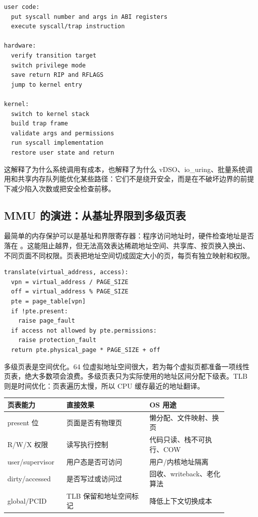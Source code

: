 \begin{lstlisting}
user code:
  put syscall number and args in ABI registers
  execute syscall/trap instruction

hardware:
  verify transition target
  switch privilege mode
  save return RIP and RFLAGS
  jump to kernel entry

kernel:
  switch to kernel stack
  build trap frame
  validate args and permissions
  run syscall implementation
  restore user state and return
\end{lstlisting}

这解释了为什么系统调用有成本，也解释了为什么 vDSO、io\_uring、批量系统调用和共享内存队列能优化某些路径：它们不是绕开安全，而是在不破坏边界的前提下减少陷入次数或把安全检查前移。

\subsection{MMU 的演进：从基址界限到多级页表}

最简单的内存保护可以是基址和界限寄存器：程序访问地址时，硬件检查地址是否落在 。这能阻止越界，但无法高效表达稀疏地址空间、共享库、按页换入换出、不同页面不同权限。页表把地址空间切成固定大小的页，每页有独立映射和权限。

\begin{lstlisting}
translate(virtual_address, access):
  vpn = virtual_address / PAGE_SIZE
  off = virtual_address % PAGE_SIZE
  pte = page_table[vpn]
  if !pte.present:
    raise page_fault
  if access not allowed by pte.permissions:
    raise protection_fault
  return pte.physical_page * PAGE_SIZE + off
\end{lstlisting}

多级页表是空间优化。64 位虚拟地址空间很大，若为每个虚拟页都准备一项线性页表，绝大多数项会浪费。多级页表只为实际使用的地址区间分配下级表。TLB 则是时间优化：页表遍历太慢，所以 CPU 缓存最近的地址翻译。

\begin{longtable}{p{0.22\linewidth}p{0.34\linewidth}p{0.32\linewidth}}
\toprule
页表能力 & 直接效果 & OS 用途 \\
\midrule
present 位 & 页面是否有物理页 & 懒分配、文件映射、换页 \\
R/W/X 权限 & 读写执行控制 & 代码只读、栈不可执行、COW \\
user/supervisor & 用户态是否可访问 & 用户/内核地址隔离 \\
dirty/accessed & 是否写过或访问过 & 回收、writeback、老化算法 \\
global/PCID & TLB 保留和地址空间标记 & 降低上下文切换成本 \\
\bottomrule
\end{longtable}


